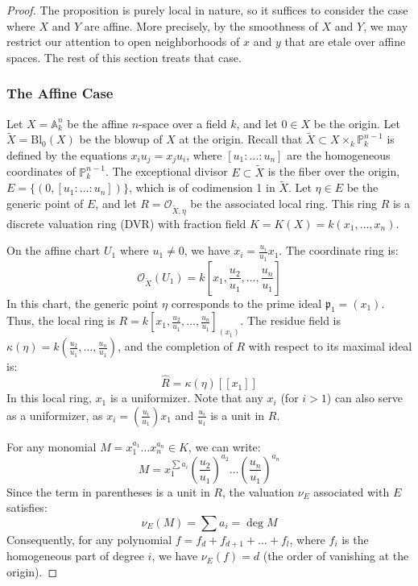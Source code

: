 \begin{proof}
The proposition is purely local in nature, so it suffices to consider the case where $X$ and $Y$ are affine. 
More precisely, by the smoothness of $X$ and $Y$, we may restrict our attention to open neighborhoods of $x$ and $y$ that are etale over affine spaces. 
The rest of this section treats that case.

\subsubsection*{The Affine Case}
Let $X = \mathbb{A}_k^n$ be the affine $n$-space over a field $k$, and let $0 \in X$ be the origin. 
Let $\tilde{X} = \text{Bl}_0(X)$ be the blowup of $X$ at the origin. 
Recall that $\tilde{X} \subset X \times_k \mathbb{P}^{n-1}_k$ is defined by the equations $x_i u_j = x_j u_i$, where $[u_1 : \dots : u_n]$ are the homogeneous coordinates of 
$\mathbb{P}^{n-1}_k$.
The exceptional divisor $E \subset \tilde{X}$ is the fiber over the origin, $E = \{ (0, [u_1 : \dots : u_n]) \}$, which is of codimension 1 in $\tilde{X}$. 
Let $\eta \in E$ be the generic point of $E$, and let $R = \mathcal{O}_{\tilde{X}, \eta}$ be the associated local ring. 
This ring $R$ is a discrete valuation ring (DVR) with fraction field $K = K(X) = k(x_1, \dots, x_n)$.

On the affine chart $U_1$ where $u_1 \neq 0$, we have $x_i = \frac{u_i}{u_1} x_1$. 
The coordinate ring is:$$\mathcal{O}_{\tilde{X}}(U_1) = k\left[x_1, \frac{u_2}{u_1}, \dots, \frac{u_n}{u_1}\right]$$
In this chart, the generic point $\eta$ corresponds to the prime ideal $\mathfrak{p}_1 = (x_1)$. Thus, the local ring is $R = k[x_1, \frac{u_2}{u_1}, \dots, \frac{u_n}{u_1}]_{(x_1)}$. 
The residue field is $\kappa(\eta) = k(\frac{u_2}{u_1}, \dots, \frac{u_n}{u_1})$, and the completion of $R$ with respect to its maximal ideal is:
$$\hat{R} = \kappa(\eta)[[x_1]]$$
In this local ring, $x_1$ is a uniformizer. Note that any $x_i$ (for $i > 1$) can also serve as a uniformizer, 
as $x_i = (\frac{u_i}{u_1}) x_1$ and $\frac{u_i}{u_1}$ is a unit in $R$.

For any monomial $M = x_1^{a_1} \dots x_n^{a_n} \in K$, we can write:
$$M = x_1^{\sum a_i} \left( \frac{u_2}{u_1} \right)^{a_2} \dots \left( \frac{u_n}{u_1} \right)^{a_n}$$
Since the term in parentheses is a unit in $R$, the valuation $\nu_E$ associated with $E$ satisfies:
$$\nu_E(M) = \sum a_i = \deg M$$
Consequently, for any polynomial $f = f_d + f_{d+1} + \dots + f_l$, where $f_i$ is the homogeneous part of degree $i$, we have $\nu_E(f) = d$ (the order of vanishing at the origin).


\end{proof}
